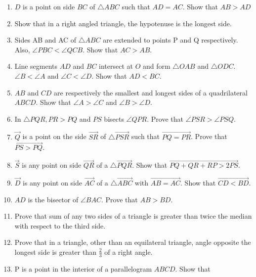 \begin{enumerate}[label=\thesection.\arabic*.,ref=\thesection.\theenumi]
\item $D$ is a point on side $BC$ of $\triangle  ABC$ such that $AD = AC$. Show that $AB > AD$
\item Show that in a right angled triangle, the hypotenuse is the longest side.
\item Sides AB and AC of $\triangle  ABC$ are extended to points P and Q respectively. Also, $\angle  PBC < \angle  QCB$. Show that $AC > AB$.

\item Line segments $AD$ and $BC$ intersect at $O$ and form $\triangle OAB$ and $\triangle ODC$. $\angle  B < \angle  A$ and $\angle  C < \angle  D$. Show that $AD < BC$.

\item $AB$ and $CD$ are respectively the smallest and longest sides of a quadrilateral $ABCD$. Show that $\angle  A > \angle  C$ and $\angle  B > \angle  D$.
%
\item In $\triangle PQR,  PR > PQ$ and $PS$ bisects $\angle  QPR$. Prove that $\angle  PSR > \angle  PSQ$.
\item $\vec{Q}$ is a point on the side $\vec{SR}$ of $\triangle \vec{PSR}$ such that $\vec{PQ=PR}$. Prove that $\vec{PS>PQ}$.
\item $\vec{S}$ is any point on side $\vec{QR}$ of a $\triangle \vec{PQR}$. Show that $\vec{PQ+QR+RP>2PS}$.
\item $\vec{D}$ is any point on side $\vec{AC}$ of a $\triangle \vec{ABC}$ with $\vec{AB=AC}$. Show that $\vec{CD<BD}$.
\item $AD$ is the bisector of $\angle BAC$. Prove that $AB>BD$.
\item Prove that sum of any two sides of a triangle is greater than twice the median with respect to the third side.
\item Prove that in a triangle, other than an equilateral triangle, angle opposite the longest side is greater than $\frac{2}{3}$ of a right angle.
\item P is a point in the interior of a parallelogram $ABCD$. Show that
\end{enumerate}
